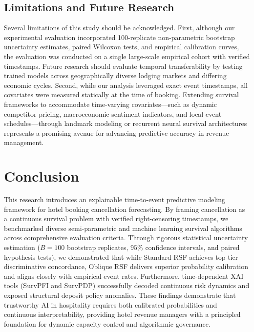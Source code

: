 \documentclass[pdflatex,iicol,sn-mathphys-ay]{sn-jnl}
\theoremstyle{thmstyleone}%
\theoremstyle{thmstyletwo}%
\theoremstyle{thmstylethree}%
\begin{document}
\subsection{Limitations and Future Research}
Several limitations of this study should be acknowledged. First, although our experimental evaluation incorporated 100-replicate non-parametric bootstrap uncertainty estimates, paired Wilcoxon tests, and empirical calibration curves, the evaluation was conducted on a single large-scale empirical cohort with verified timestamps. Future research should evaluate temporal transferability by testing trained models across geographically diverse lodging markets and differing economic cycles. Second, while our analysis leveraged exact event timestamps, all covariates were measured statically at the time of booking. Extending survival frameworks to accommodate time-varying covariates—such as dynamic competitor pricing, macroeconomic sentiment indicators, and local event schedules—through landmark modeling or recurrent neural survival architectures represents a promising avenue for advancing predictive accuracy in revenue management.

\section{Conclusion}
\label{sec:conclusion}

This research introduces an explainable time-to-event predictive modeling framework for hotel booking cancellation forecasting. By framing cancellation as a continuous survival problem with verified right-censoring timestamps, we benchmarked diverse semi-parametric and machine learning survival algorithms across comprehensive evaluation criteria. Through rigorous statistical uncertainty estimation ($B=100$ bootstrap replicates, $95\%$ confidence intervals, and paired hypothesis tests), we demonstrated that while Standard RSF achieves top-tier discriminative concordance, Oblique RSF delivers superior probability calibration and aligns closely with empirical event rates. Furthermore, time-dependent XAI tools (SurvPFI and SurvPDP) successfully decoded continuous risk dynamics and exposed structural deposit policy anomalies. These findings demonstrate that trustworthy AI in hospitality requires both calibrated probabilities and continuous interpretability, providing hotel revenue managers with a principled foundation for dynamic capacity control and algorithmic governance.

\backmatter
\end{document}
